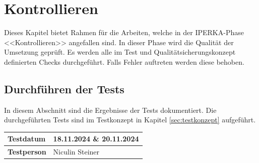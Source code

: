\chapter{Kontrollieren}\label{ch:kontrollieren}
Dieses Kapitel bietet Rahmen für die Arbeiten, welche in der IPERKA-Phase <<Kontrollieren>> angefallen sind. In dieser Phase wird die Qualität der Umsetzung geprüft. Es werden alle im Test und Qualitätsicherungskonzept definierten Checks durchgeführt. Falls Fehler auftreten werden diese behoben.
\section{Durchführen der Tests}
In diesem Abschnitt sind die Ergebnisse der Tests dokumentiert. Die durchgeführten Tests sind im Testkonzept in Kapitel \ref{sec:testkonzept} aufgeführt.
\begin{longtable}{|p{}|p{}|}
	\hline
	\textbf{Testdatum} & 18.11.2024 \& 20.11.2024\\
	\hline
	\textbf{Testperson} & Niculin Steiner\\
	\hline
\end{longtable}


